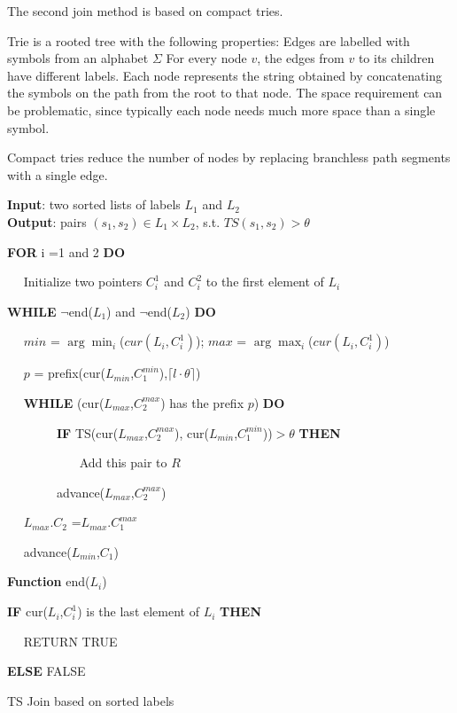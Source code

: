 The second join method is based on compact tries.

Trie is a rooted tree with the following properties: Edges are labelled with symbols from an alphabet $\Sigma$
For every node $v$, the edges from $v$ to its children have different labels. Each node represents the string obtained by concatenating the symbols on the path from the root to that node. The space requirement can be problematic, since typically each node needs
much more space than a single symbol.



Compact tries reduce the number of nodes by replacing branchless path segments with a single edge.




\begin{algorithm}
{\bf Input}: two sorted lists of labels $L_1$ and $L_2$\\
{\bf Output}: pairs $(s_1,s_2) \in L_1 \times L_2$, s.t. $TS(s_1, s_2) > \theta$
\begin{compactenum}[(1)]
\item {\bf FOR}  i =1 and 2 {\bf DO}
\item ~~ Initialize two pointers $C_i^1$ and $C_i^2$ to the first element of  $L_i$
\item {\bf WHILE}  $\neg$end($L_1$) and $\neg$end($L_2$) {\bf DO}
\item ~~ $min$ = $\arg\min_{i}$($cur(L_i,C_i^1)$); $max$ = $\arg\max_{i}$($cur(L_i,C_i^1)$)
\item ~~ $p$ = prefix(cur($L_{min}$,$C_1^{min}$),$  \lceil l \cdot \theta \rceil$)
\item ~~ {\bf WHILE} (cur($L_{max}$,$C_2^{max}$) has the prefix $p$) {\bf DO}
\item ~~ ~~ ~~ {\bf IF} TS(cur($L_{max}$,$C_2^{max}$), cur($L_{min}$,$C_1^{min}$))$> \theta$ {\bf THEN}
\item ~~~   ~~ ~~ ~~ Add this pair to $R$
\item ~~ ~~ ~~  advance($L_{max}$,$C_2^{max}$)
\item ~~ $L_{max}.C_2$ =$L_{max}.C_1^{max}$
\item ~~ advance($L_{min}$,$C_1$)
\end{compactenum}
\smallskip
\textbf{Function} end($L_i$)
\begin{compactenum}[(1)]
\item {\bf IF}  cur($L_i$,$C_i^1$) is the last element of $L_i$ {\bf THEN}
\item  ~~ RETURN TRUE 
\item  {\bf ELSE} FALSE
\end{compactenum}
\caption{TS Join based on sorted labels}
\label{alg:exactjoin}
\end{algorithm}

